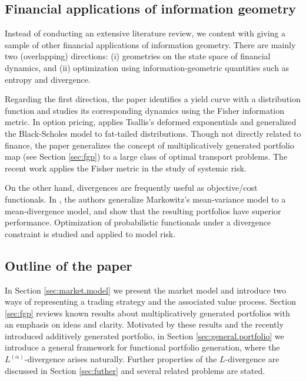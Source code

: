\documentclass[graybox]{svmult}
\begin{document}
\subsection{Financial applications of information geometry} \label{sec:literature}
Instead of conducting an extensive literature review, we content with giving a sample of other financial applications of information geometry. There are mainly two (overlapping) directions: (i) geometries on the state space of financial dynamics, and (ii) optimization using information-geometric quantities such as entropy and divergence. 

Regarding the first direction, the paper \cite{BH01} identifies a yield curve with a distribution function and studies its corresponding dynamics using the Fisher information metric. In option pricing, \cite{T13} applies Tsallis's deformed exponentials and generalized the Black-Scholes model to fat-tailed distributions. Though not directly related to finance, the paper \cite{P17} generalizes the concept of multiplicatively generated portfolio map (see Section \ref{sec:fgp}) to a large class of optimal transport problems. The recent work \cite{KY16} applies the Fisher metric in the study of systemic risk.

On the other hand, divergences are frequently useful as objective/cost functionals. In \cite{NMBN11, NMBN13}, the authors generalize Markowitz's mean-variance model to a mean-divergence model, and show that the resulting portfolios have superior performance. Optimization of probabilistic functionals under a divergence constraint is studied \cite{BC13} and applied to model risk.


\subsection{Outline of the paper}
In Section \ref{sec:market.model} we present the market model and introduce two ways of representing a trading strategy and the associated value process. Section \ref{sec:fgp} reviews known results about multiplicatively generated portfolios with an emphasis on ideas and clarity. Motivated by these results and the recently introduced additively generated portfolio, in Section \ref{sec:general.portfolio} we introduce a general framework for functional portfolio generation, where the $L^{(\alpha)}$-divergence arises naturally. Further properties of the $L$-divergence are discussed in Section \ref{sec:futher} and several related problems are stated.
\end{document}
